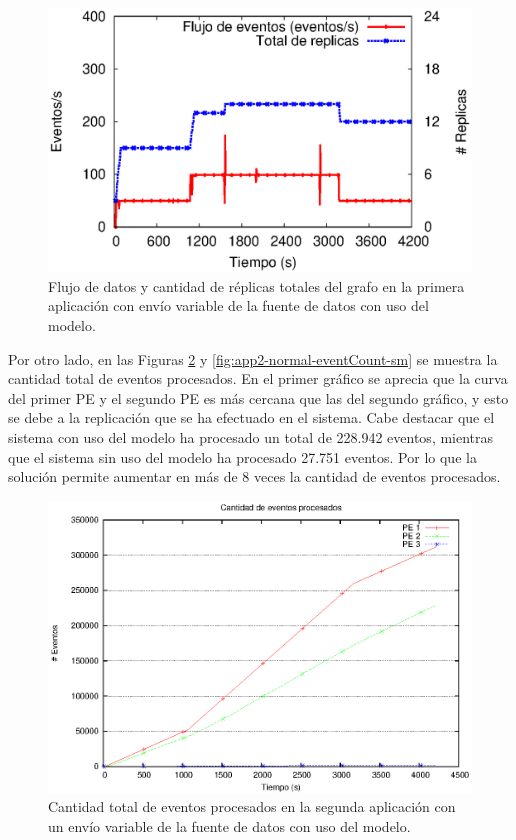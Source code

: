 \begin{figure}[!ht]
	\centering
	\includegraphics[scale=0.7]{images/exp/app2/normal/cm/processSystem.eps}
    \caption{Flujo de datos y cantidad de réplicas totales del grafo en la primera aplicación con envío variable de la fuente de datos con uso del modelo.}
	\label{fig:app2-normal-processSystem-cm}
\end{figure}


Por otro lado, en las Figuras \ref{fig:app2-normal-eventCount-cm} y \ref{fig:app2-normal-eventCount-sm} se muestra la cantidad total de eventos procesados. En el primer gráfico se aprecia que la curva del primer PE y el segundo PE es más cercana que las del segundo gráfico, y esto se debe a la replicación que se ha efectuado en el sistema. Cabe destacar que el sistema con uso del modelo ha procesado un total de 228.942 eventos, mientras que el sistema sin uso del modelo ha procesado 27.751 eventos. Por lo que la solución permite aumentar en más de 8 veces la cantidad de eventos procesados.

\begin{figure}[!ht]
	\centering
    \includegraphics[scale=0.7]{images/exp/app2/normal/cm/eventCount.eps}
    \caption{Cantidad total de eventos procesados en la segunda aplicación con un envío variable de la fuente de datos con uso del modelo.}
    \label{fig:app2-normal-eventCount-cm}
\end{figure}

